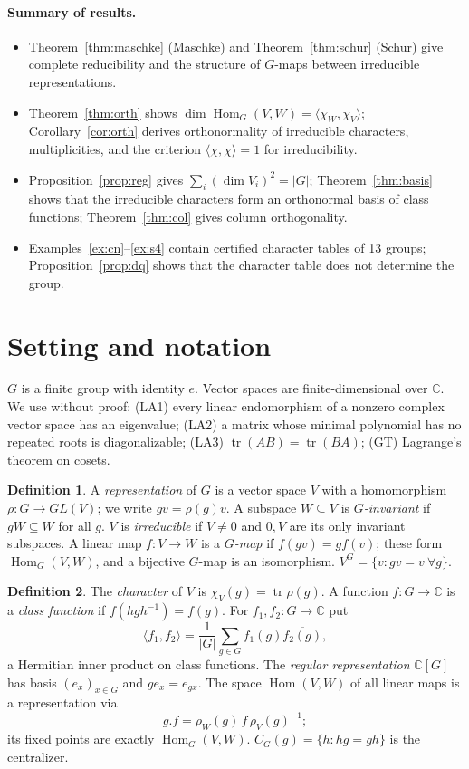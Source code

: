 \documentclass[11pt]{article}
\theoremstyle{definition}
\newtheorem{definition}{Definition}
\theoremstyle{remark}
\newcommand{\C}{\mathbb{C}}
\newcommand{\Hom}{\operatorname{Hom}}
\newcommand{\tr}{\operatorname{tr}}
\newcommand{\ip}[2]{\langle #1, #2\rangle}
\begin{document}
\paragraph{Summary of results.}
\begin{itemize}
\item Theorem~\ref{thm:maschke} (Maschke) and Theorem~\ref{thm:schur} (Schur) give complete reducibility and the
structure of $G$-maps between irreducible representations.
\item Theorem~\ref{thm:orth} shows $\dim\Hom_G(V,W)=\ip{\chi_W}{\chi_V}$; Corollary~\ref{cor:orth} derives orthonormality of
irreducible characters, multiplicities, and the criterion $\ip{\chi}{\chi}=1$ for irreducibility.
\item Proposition~\ref{prop:reg} gives $\sum_i(\dim V_i)^2=|G|$; Theorem~\ref{thm:basis} shows that the irreducible characters
form an orthonormal basis of class functions; Theorem~\ref{thm:col} gives column orthogonality.
\item Examples~\ref{ex:cn}--\ref{ex:s4} contain certified character tables of 13 groups; Proposition~\ref{prop:dq} shows that
the character table does not determine the group.
\end{itemize}

\section{Setting and notation}
$G$ is a finite group with identity $e$. Vector spaces are finite-dimensional over $\C$. We use without proof:
(LA1) every linear endomorphism of a nonzero complex vector space has an eigenvalue; (LA2) a matrix whose minimal
polynomial has no repeated roots is diagonalizable; (LA3) $\tr(AB)=\tr(BA)$; (GT) Lagrange's theorem on cosets.

\begin{definition}
A \emph{representation} of $G$ is a vector space $V$ with a homomorphism $\rho\colon G\to GL(V)$; we write $gv=\rho(g)v$.
A subspace $W\subseteq V$ is \emph{$G$-invariant} if $gW\subseteq W$ for all $g$. $V$ is \emph{irreducible} if $V\neq0$ and
$0,V$ are its only invariant subspaces. A linear map $f\colon V\to W$ is a \emph{$G$-map} if $f(gv)=gf(v)$; these form
$\Hom_G(V,W)$, and a bijective $G$-map is an isomorphism. $V^G=\{v: gv=v\ \forall g\}$.
\end{definition}

\begin{definition}
The \emph{character} of $V$ is $\chi_V(g)=\tr\rho(g)$. A function $f\colon G\to\C$ is a \emph{class function} if
$f(hgh^{-1})=f(g)$. For $f_1,f_2\colon G\to\C$ put
\[ \ip{f_1}{f_2}=\frac1{|G|}\sum_{g\in G}f_1(g)\overline{f_2(g)}, \]
a Hermitian inner product on class functions.
The \emph{regular representation} $\C[G]$ has basis $(e_x)_{x\in G}$ and
$ge_x=e_{gx}$. The space $\Hom(V,W)$ of all linear maps
is a representation via
\[ g.f=\rho_W(g)\,f\,\rho_V(g)^{-1}; \]
its fixed points are exactly $\Hom_G(V,W)$. $C_G(g)=\{h: hg=gh\}$ is the centralizer.
\end{definition}
\end{document}
